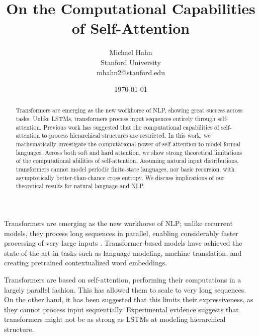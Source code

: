 \documentclass[11pt,a4paper]{article}
\title{On the Computational Capabilities of Self-Attention}
\author{Michael Hahn \\ Stanford University \\ mhahn2@stanford.edu}
\date{\today}
\begin{document}
\maketitle
\begin{abstract}
Transformers are emerging as the new workhorse of NLP, showing great success across tasks.
Unlike LSTMs, transformers process input sequences entirely through self-attention.
Previous work has suggested that the computational capabilities of self-attention to process hierarchical structures are restricted.
In this work, we mathematically investigate the computational power of self-attention to model formal languages.
Across both soft and hard attention, we show strong theoretical limitations of the computational abilities of self-attention.
Assuming natural input distributions, transformers cannot model periodic finite-state languages, nor basic recursion, with asymptotically better-than-chance cross entropy. %
We discuss implications of our theoretical results for natural language and NLP.
\end{abstract}


Transformers are emerging as the new workhorse of NLP;
unlike recurrent models, they process long sequences in parallel, enabling considerably faster processing of very large inputs \cite{vaswani2017attention}.
Transformer-based models have achieved the state-of-the art in tasks such as language modeling, machine translation, and creating pretrained contextualized word embeddings.


Transformers are based on self-attention, performing their computations in a largely parallel fashion.
This has allowed them to scale to very long sequences.
On the other hand, it has been suggested that this limits their expressiveness, as they cannot process input sequentially.
Experimental evidence suggests that transformers might not be as strong as LSTMs at modeling hierarchical structure.
\end{document}
